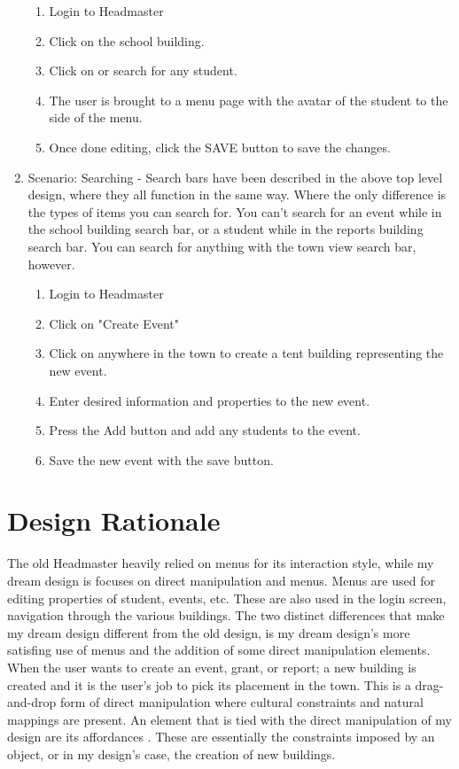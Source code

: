 \documentclass[11pt]{article}
\begin{document}
\begin{enumerate}
  \begin{enumerate}
        \item Login to Headmaster
        \item Click on the school building.
        \item Click on or search for any student.
        \item The user is brought to a menu page with the avatar of the student to the side of the menu.
        \item Once done editing, click the SAVE button to save the changes.
  \end{enumerate}
    \item Scenario: Searching -
Search bars have been described in the above top level design, where they all function in the same way. Where the only difference is the types of items you can search for. You can't search for an event while in the school building search bar, or a student while in the reports building search bar. You can search for anything with the town view search bar, however.
  \begin{enumerate}
        \item Login to Headmaster
        \item Click on "Create Event"
        \item Click on anywhere in the town to create a tent building representing the new event.
        \item Enter desired information and properties to the new event.
        \item Press the Add button and add any students to the event.
        \item Save the new event with the save button.
  \end{enumerate}
\end{enumerate}

\section{Design Rationale}
The old Headmaster heavily relied on menus for its interaction style, while my dream design is focuses on direct manipulation and menus. Menus are used for editing properties of student, events, etc. These are also used in the login screen, navigation through the various buildings. The two distinct differences that make my dream design different from the old design, is my dream design's more satisfing use of menus and the addition of some direct manipulation elements. When the user wants to create an event, grant, or report; a new building is created and it is the user's job to pick its placement in the town. This is a drag-and-drop form of direct manipulation where cultural constraints and natural mappings are present. An element that is tied with the direct manipulation of my design are its affordances \cite{design}. These are essentially the constraints imposed by an object, or in my design's case, the creation of new buildings. 
\end{document}
